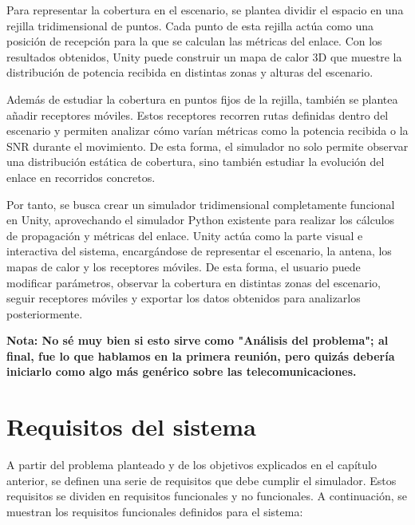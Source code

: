 Para representar la cobertura en el escenario, se plantea dividir el espacio en una rejilla tridimensional de puntos. Cada punto de esta rejilla actúa como una posición de recepción para la que se calculan las métricas del enlace. Con los resultados obtenidos, Unity puede construir un mapa de calor 3D que muestre la distribución de potencia recibida en distintas zonas y alturas del escenario.

Además de estudiar la cobertura en puntos fijos de la rejilla, también se plantea añadir receptores móviles. Estos receptores recorren rutas definidas dentro del escenario y permiten analizar cómo varían métricas como la potencia recibida o la SNR durante el movimiento. De esta forma, el simulador no solo permite observar una distribución estática de cobertura, sino también estudiar la evolución del enlace en recorridos concretos.

Por tanto, se busca crear un simulador tridimensional completamente funcional en Unity, aprovechando el simulador Python existente para realizar los cálculos de propagación y métricas del enlace. Unity actúa como la parte visual e interactiva del sistema, encargándose de representar el escenario, la antena, los mapas de calor y los receptores móviles. De esta forma, el usuario puede modificar parámetros, observar la cobertura en distintas zonas del escenario, seguir receptores móviles y exportar los datos obtenidos para analizarlos posteriormente.

\par\medskip
\textbf{Nota: No sé muy bien si esto sirve como "Análisis del problema"; al final, fue lo que hablamos en la primera reunión, pero quizás debería iniciarlo como algo más genérico sobre las telecomunicaciones.}
\par\medskip

\section{Requisitos del sistema}

A partir del problema planteado y de los objetivos explicados en el capítulo anterior, se definen una serie de requisitos que debe cumplir el simulador. Estos requisitos se dividen en requisitos funcionales y no funcionales. A continuación, se muestran los requisitos funcionales definidos para el sistema:


